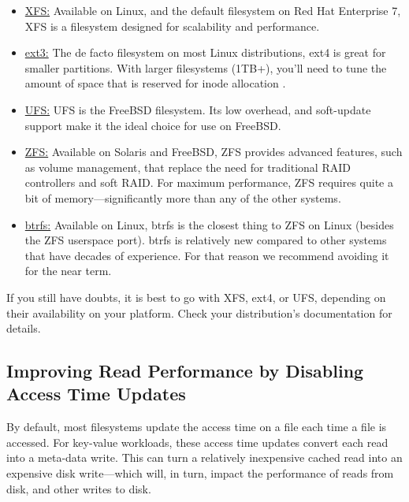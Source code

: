 \begin{itemize}
    \item \href{https://www.kernel.org/doc/Documentation/filesystems/xfs.txt}{XFS:}
        Available on Linux, and the default filesystem on Red Hat Enterprise 7,
        XFS is a filesystem designed for scalability and performance.
    \item \href{https://www.kernel.org/doc/Documentation/filesystems/ext4.txt}{ext3:}
        The de facto filesystem on most Linux distributions, ext4 is great for
        smaller partitions.  With larger filesystems (1TB+), you'll need to tune
        the amount of space that is reserved for inode allocation .
    \item \href{https://www.freebsd.org/cgi/man.cgi?query=newfs&apropos=0&sektion=0&manpath=FreeBSD+10.1-RELEASE&arch=default&format=html}{UFS:}
        UFS is the FreeBSD filesystem.  Its low overhead, and soft-update
        support make it the ideal choice for use on FreeBSD.
    \item \href{https://www.freebsd.org/cgi/man.cgi?query=zfs&apropos=0&sektion=0&manpath=FreeBSD+10.1-RELEASE&arch=default&format=html}{ZFS:}
        Available on Solaris and FreeBSD, ZFS provides advanced features, such
        as volume management, that replace the need for traditional RAID
        controllers and soft RAID.  For maximum performance, ZFS requires quite
        a bit of memory---significantly more than any of the other systems.
    \item \href{https://www.kernel.org/doc/Documentation/filesystems/btrfs.txt}{btrfs:}
        Available on Linux, btrfs is the closest thing to ZFS on Linux (besides
        the ZFS userspace port).  btrfs is relatively new compared to other
        systems that have decades of experience.   For that reason we recommend
        avoiding it for the near term.
\end{itemize}

If you still have doubts, it is best to go with XFS, ext4, or UFS, depending on
their availability on your platform.  Check your distribution's documentation
for details.

\subsection{Improving Read Performance by Disabling Access Time Updates}

By default, most filesystems update the access time on a file each time a file
is accessed.  For key-value workloads, these access time updates convert each
read into a meta-data write.  This can turn a relatively inexpensive cached read
into an expensive disk write---which will, in turn, impact the performance of
reads from disk, and other writes to disk.

